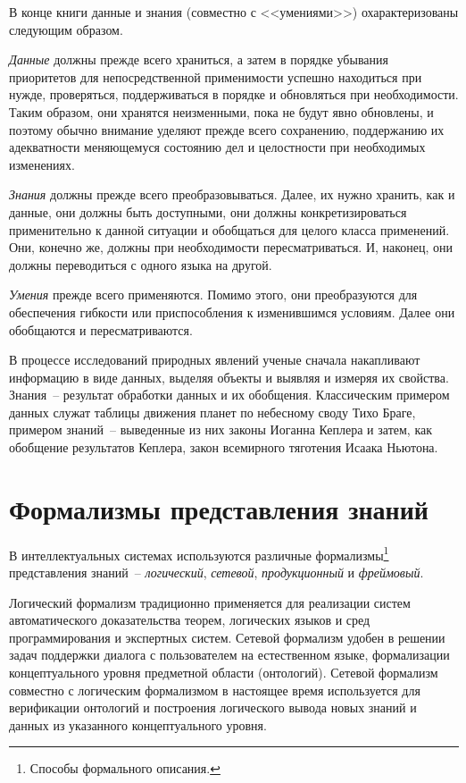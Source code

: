 \documentclass[a4paper,14pt, openany, twoside, final]{extbook} %
\begin{document}
В конце книги \cite{DDWII} данные и знания (совместно с <<умениями>>) охарактеризованы следующим образом.

{\em Данные} должны прежде всего храниться, а затем в порядке убывания приоритетов для непосредственной применимости успешно находиться при нужде, проверяться, поддерживаться в порядке и обновляться при необходимости. Таким образом, они хранятся неизменными, пока не будут явно обновлены, и поэтому обычно внимание уделяют прежде всего сохранению, поддержанию их адекватности меняющемуся состоянию дел и целостности при необходимых изменениях.

{\em Знания} должны прежде всего преобразовываться. Далее, их нужно хранить, как и данные, они должны быть доступными, они должны конкретизироваться применительно к данной ситуации и обобщаться для целого класса применений. Они, конечно же, должны при необходимости пересматриваться. И, наконец, они должны переводиться с одного языка на другой.

{\em Умения} прежде всего применяются. Помимо этого, они преобразуются для обеспечения гибкости или приспособления к изменившимся условиям. Далее они обобщаются и пересматриваются.

В процессе исследований природных явлений ученые сначала накапливают информацию в виде данных, выделяя объекты и выявляя и измеряя их свойства.  Знания~-- результат обработки данных и их обобщения.  Классическим примером данных служат таблицы движения планет по небесному своду Тихо Браге, примером знаний~-- выведенные из них законы Иоганна Кеплера и затем, как обобщение результатов Кеплера, закон всемирного тяготения Исаака Ньютона.\enlargethispage{-3.5em}

\section{Формализмы представления знаний}
\label{sec:knowlege_repr}

В интеллектуальных системах используются различные формализмы\footnote{Способы формального описания.} представления знаний~-- {\em логический}, {\em сетевой}, {\em продукционный} и {\em фреймовый}.

Логический формализм традиционно применяется для реализации систем автоматического доказательства теорем, логических языков и сред программирования и экспертных систем.  Сетевой формализм удобен в решении задач поддержки диалога с пользователем на естественном языке, формализации концептуального уровня предметной области (онтологий).  Сетевой формализм совместно с логическим формализмом в настоящее время используется для верификации онтологий и построения логического вывода новых знаний и данных из указанного концептуального уровня.
\end{document}
